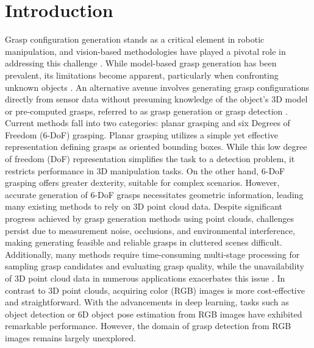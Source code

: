 \section{Introduction}
\label{sec:intro}

Grasp configuration generation stands as a critical element in robotic manipulation, and vision-based methodologies have played a pivotal role in addressing this challenge \cite{hoang2023grasp, hoang2022context, fang2020graspnet}. While model-based grasp generation has been prevalent, its limitations become apparent, particularly when confronting unknown objects \cite{du2021vision, hoang2020panoptic, hoang2020object, hoang2016sub}. An alternative avenue involves generating grasp configurations directly from sensor data without presuming knowledge of the object's 3D model or pre-computed grasps, referred to as grasp generation or grasp detection \cite{fang2020graspnet, hoang2022context}. Current methods fall into two categories: planar grasping and six Degrees of Freedom (6-DoF) grasping. Planar grasping utilizes a simple yet effective representation defining grasps as oriented bounding boxes. While this low degree of freedom (DoF) representation simplifies the task to a detection problem, it restricts performance in 3D manipulation tasks. On the other hand, 6-DoF grasping offers greater dexterity, suitable for complex scenarios. However, accurate generation of 6-DoF grasps necessitates geometric information, leading many existing methods to rely on 3D point cloud data. Despite significant progress achieved by grasp generation methods using point clouds, challenges persist due to measurement noise, occlusions, and environmental interference, making generating feasible and reliable grasps in cluttered scenes difficult. Additionally, many methods require time-consuming multi-stage processing for sampling grasp candidates and evaluating grasp quality, while the unavailability of 3D point cloud data in numerous applications exacerbates this issue \cite{ten2017grasp, liang2019pointnetgpd, du2021vision}. In contrast to 3D point clouds, acquiring color (RGB) images is more cost-effective and straightforward. With the advancements in deep learning, tasks such as object detection or 6D object pose estimation from RGB images have exhibited remarkable performance. However, the domain of grasp detection from RGB images remains largely unexplored.

